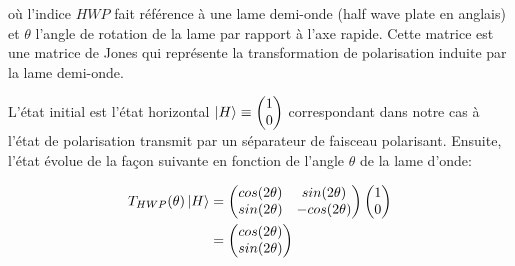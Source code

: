 \begin{onehalfspace}
    \noindent où l'indice $HWP$ fait référence à une lame demi-onde
    (\guillemetleft half wave plate \guillemetright en anglais) 
    et $\theta$ l'angle de rotation de la lame par 
    rapport à l'axe rapide.
    Cette matrice est une matrice de Jones qui 
    représente la transformation de polarisation induite par la lame 
    demi-onde.

    \noindent L'état initial est l’état horizontal 
    $\ket{H} \equiv \begin{pmatrix}
        1\\
        0
    \end{pmatrix}$ correspondant dans notre cas à l'état de polarisation 
    transmit par un séparateur 
    de faisceau polarisant. Ensuite, l'état évolue de la façon 
    suivante en fonction de l'angle $\theta$ de la lame d'onde:
\end{onehalfspace}

\begin{align}
    T_{HWP}(\theta)\ket{H} &= \begin{pmatrix}
        cos(2\theta) & sin(2\theta)\\
        sin(2\theta) & -cos(2\theta)
    \end{pmatrix} \begin{pmatrix}
        1\\0
    \end{pmatrix}\\
    &= \begin{pmatrix}
        cos(2\theta)\\sin(2\theta)
    \end{pmatrix}\label{eq:state1_Jones}
\end{align}

